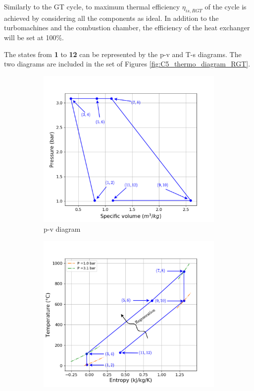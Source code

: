 Similarly to the GT cycle, to maximum thermal efficiency $\eta_{is,RGT}$ of the cycle is achieved by considering all the components as ideal. In addition to the turbomachines and the combustion chamber, the efficiency of the heat exchanger will be set at 100\%. 

The states from \textbf{1} to \textbf{12} can be represented by the p-v and T-s  diagrams. The two diagrams are included in the set of Figures \ref{fig:C5_thermo_diagram_RGT}.

\begin{figure}[h]
     \centering
     \begin{subfigure}[b]{0.4\textwidth}
         \centering
         \includegraphics[width=\textwidth]{pv_RGT}
         \caption{p-v diagram}
         \label{fig:C5_pv_RGT}
     \end{subfigure}
     \begin{subfigure}[b]{0.4\textwidth}
         \centering
         \includegraphics[width=\textwidth]{Ts_RGT}

\end{subfigure}
\end{figure}
